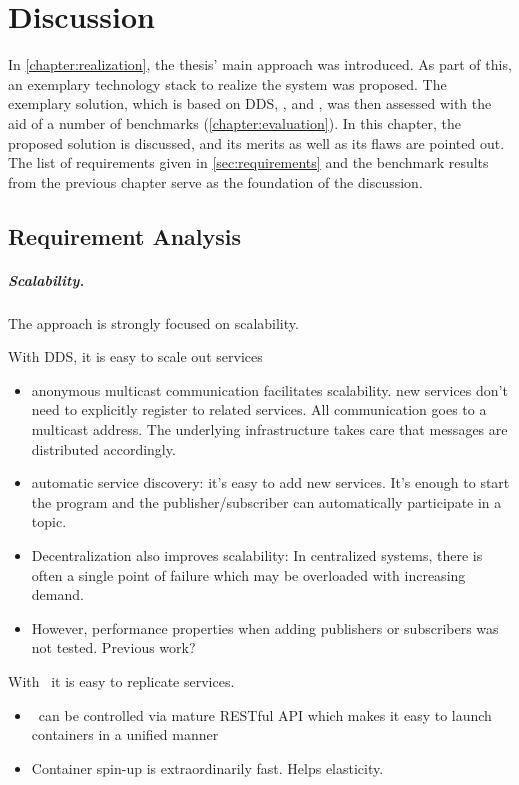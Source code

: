 \chapter{Discussion}\label{chapter:discussion}
In \autoref{chapter:realization}, the thesis' main approach was introduced. As part of this, an exemplary technology stack to realize the system was proposed. The exemplary solution, which is based on DDS, \docker , and \wnet , was then assessed with the aid of a number of benchmarks (\cf \autoref{chapter:evaluation}). In this chapter, the proposed solution is discussed, and its merits as well as its flaws are pointed out. The list of requirements given in \autoref{sec:requirements} and the benchmark results from the previous chapter serve as the foundation of the discussion. 


\section{Requirement Analysis}
\paragraph{Scalability.}
The approach is strongly focused on scalability. 

With DDS, it is easy to scale out services
\begin{itemize}
\item anonymous multicast communication facilitates scalability. new services don't need to explicitly register to related services. All communication goes to a multicast address. The underlying infrastructure takes care that messages are distributed accordingly.
\item automatic service discovery: it's easy to add new services. It's enough to start the program and the publisher/subscriber can automatically participate in a topic.
\item Decentralization also improves scalability: In centralized systems, there is often a single point of failure which may be overloaded with increasing demand. 
\item However, performance properties when adding publishers or subscribers was not tested. Previous work?
\end{itemize}

With \docker\ it is easy to replicate services. 
\begin{itemize}
\item \docker\ can be controlled via mature RESTful API which makes it easy to launch containers in a unified manner
\item Container spin-up is extraordinarily fast. Helps elasticity.
\end{itemize}

